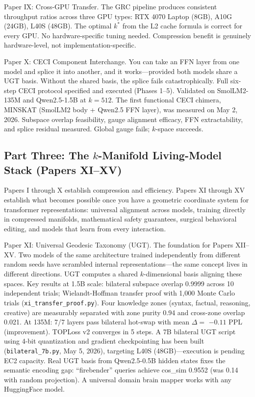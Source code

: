 \documentclass[11pt]{article}
\begin{document}
Paper IX: Cross-GPU Transfer. The GRC pipeline produces consistent throughput ratios across three GPU types: RTX 4070 Laptop (8GB), A10G (24GB), L40S (48GB). The optimal $k^*$ from the L2 cache formula is correct for every GPU. No hardware-specific tuning needed. Compression benefit is genuinely hardware-level, not implementation-specific.

Paper X: CECI Component Interchange. You can take an FFN layer from one model and splice it into another, and it works---provided both models share a UGT basis. Without the shared basis, the splice fails catastrophically. Full six-step CECI protocol specified and executed (Phases 1--5). Validated on SmolLM2-135M and Qwen2.5-1.5B at $k = 512$. The first functional CECI chimera, MINSKAT (SmolLM2 body + Qwen2.5 FFN layer), was measured on May 2, 2026. Subspace overlap feasibility, gauge alignment efficacy, FFN extractability, and splice residual measured. Global gauge fails; $k$-space succeeds. \subsection*{Part Three: The $k$-Manifold Living-Model Stack (Papers XI--XV)}

Papers I through X establish compression and efficiency. Papers XI through XV establish what becomes possible once you have a geometric coordinate system for transformer representations: universal alignment across models, training directly in compressed manifolds, mathematical safety guarantees, surgical behavioral editing, and models that learn from every interaction.

Paper XI: Universal Geodesic Taxonomy (UGT). The foundation for Papers XII--XV. Two models of the same architecture trained independently from different random seeds have scrambled internal representations---the same concept lives in different directions. UGT computes a shared $k$-dimensional basis aligning these spaces. Key results at 1.5B scale: bilateral subspace overlap 0.9999 across 10 independent trials; Wielandt-Hoffman transfer proof with 1,000 Monte Carlo trials (\texttt{xi\_transfer\_proof.py}). Four knowledge zones (syntax, factual, reasoning, creative) are measurably separated with zone purity 0.94 and cross-zone overlap 0.021. At 135M: 7/7 layers pass bilateral hot-swap with mean $\Delta =$ $-0.11$ PPL (improvement). TOPLoss v2 converges in 5 steps. A 7B bilateral UGT script using 4-bit quantization and gradient checkpointing has been built (\texttt{bilateral\_7b.py}, May 5, 2026), targeting L40S (48GB)---execution is pending EC2 capacity. Real UGT basis from Qwen2.5-0.5B hidden states fixes the semantic encoding gap: ``firebender'' queries achieve cos\_sim 0.9552 (was 0.14 with random projection). A universal domain brain mapper works with any HuggingFace model.
\end{document}
